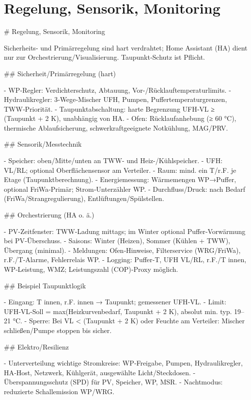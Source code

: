 \documentclass[11pt,oneside]{report}
\begin{document}
\chapter{Regelung, Sensorik, Monitoring}
\begin{markdown}
# Regelung, Sensorik, Monitoring

Sicherheits‑ und Primärregelung sind hart verdrahtet; Home Assistant (HA) dient nur zur Orchestrierung/Visualisierung. Taupunkt‑Schutz ist Pflicht.

## Sicherheit/Primärregelung (hart)

- WP‑Regler: Verdichterschutz, Abtauung, Vor-/Rücklauftemperaturlimits.
- Hydraulikregler: 3‑Wege‑Mischer UFH, Pumpen, Puffertemperaturgrenzen, TWW‑Priorität.
- Taupunktabschaltung: harte Begrenzung UFH‑VL ≥ (Taupunkt + 2 K), unabhängig von HA.
- Ofen: Rücklaufanhebung (≥ 60 °C), thermische Ablaufsicherung, schwerkraftgeeignete Notkühlung, MAG/PRV.

## Sensorik/Messtechnik

- Speicher: oben/Mitte/unten an TWW- und Heiz-/Kühlspeicher.
- UFH: VL/RL; optional Oberflächensensor am Verteiler.
- Raum: mind. ein T/r.F. je Etage (Taupunktberechnung).
- Energiemessung: Wärmemengen WP→Puffer, optional FriWa‑Primär; Strom‑Unterzähler WP.
- Durchfluss/Druck: nach Bedarf (FriWa/Strangregulierung), Entlüftungen/Spülstellen.

## Orchestrierung (HA o. ä.)

- PV‑Zeitfenster: TWW‑Ladung mittags; im Winter optional Puffer‑Vorwärmung bei PV‑Überschuss.
- Saisons: Winter (Heizen), Sommer (Kühlen + TWW), Übergang (minimal).
- Meldungen: Ofen‑Hinweise, Filterservice (WRG/FriWa), r.F./T‑Alarme, Fehlerrelais WP.
- Logging: Puffer‑T, UFH VL/RL, r.F./T innen, WP‑Leistung, WMZ; Leistungszahl (COP)‑Proxy möglich.

## Beispiel Taupunktlogik

- Eingang: T innen, r.F. innen → Taupunkt; gemessener UFH‑VL.
- Limit: UFH‑VL‑Soll = max(Heizkurvenbedarf, Taupunkt + 2 K), absolut min. typ. 19–21 °C.
- Sperre: Bei VL < (Taupunkt + 2 K) oder Feuchte am Verteiler: Mischer schließen/Pumpe stoppen bis sicher.

## Elektro/Resilienz

- Unterverteilung wichtige Stromkreise: WP‑Freigabe, Pumpen, Hydraulikregler, HA‑Host, Netzwerk, Kühlgerät, ausgewählte Licht/Steckdosen.
- Überspannungsschutz (SPD) für PV, Speicher, WP, MSR.
- Nachtmodus: reduzierte Schallemission WP/WRG.
\end{markdown}
\end{document}
